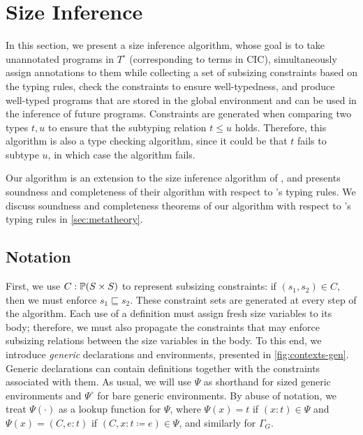\section{Size Inference}\label{sec:algorithm}

In this section, we present a size inference algorithm, whose goal is to take unannotated programs in $T^\circ$ (corresponding to terms in CIC), simultaneously assign annotations to them while collecting a set of subsizing constraints based on the typing rules, check the constraints to ensure well-typedness, and produce well-typed programs that are stored in the global environment and can be used in the inference of future programs.
Constraints are generated when comparing two types $t, u$ to ensure that the subtyping relation $t \leq u$ holds.
Therefore, this algorithm is also a type checking algorithm, since it could be that $t$ fails to subtype $u$, in which case the algorithm fails.

Our algorithm is an extension to the size inference algorithm of \CIChat, and \citet{cic-hat} presents soundness and completeness of their algorithm with respect to \CIChat's typing rules.
We discuss soundness and completeness theorems of our algorithm with respect to \lang's typing rules in \autoref{sec:metatheory}.

\subsection{Notation}



First, we use $C : \P(S \times S)$ to represent subsizing constraints: if $(s_1, s_2) \in C$, then we must enforce $s_1 \sqsubseteq s_2$.
These constraint sets are generated at every step of the algorithm.
Each use of a definition must assign fresh size variables to its body; therefore, we must also propagate the constraints that may enforce subsizing relations between the size variables in the body.
To this end, we introduce \emph{generic} declarations and environments, presented in \autoref{fig:contexts-gen}.
Generic declarations can contain definitions together with the constraints associated with them.
As usual, we will use $\Psi$ as shorthand for sized generic environments and $\Psi^\circ$ for bare generic environments.
By abuse of notation, we treat $\Psi(\cdot)$ as a lookup function for $\Psi$, where $\Psi(x) = t$ if $(x : t) \in \Psi$ and $\Psi(x) = (C, e : t)$ if $(C, x : t \coloneqq e) \in \Psi$, and similarly for $\Gamma_G$.

